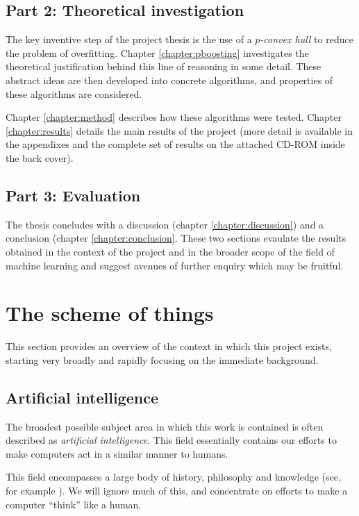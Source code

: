 \subsection*{Part 2: Theoretical investigation}

The key inventive step of the project thesis is the use of a
\emph{$p$-convex hull} to reduce the problem of overfitting.  Chapter 
\ref{chapter:pboosting} investigates the theoretical justification
behind this line of reasoning in some detail.  These abstract ideas
are then developed into concrete algorithms, and properties of these
algorithms are considered.

Chapter \ref{chapter:method} describes how these algorithms were
tested.  Chapter \ref{chapter:results} details the main results of the
project (more detail is available in the appendixes and the complete
set of results on the attached CD-ROM inside the back cover).

\subsection*{Part 3: Evaluation}

The thesis concludes with a discussion (chapter
\ref{chapter:discussion}) and a conclusion (chapter
\ref{chapter:conclusion}.  These two sections evaulate the results
obtained in the context of the project and in the broader scope of the
field of machine learning and suggest avenues of further enquiry which
may be fruitful.

\section{The scheme of things}

This section provides an overview of the context in which this project
exists, starting very broadly and rapidly focusing on the immediate
background.


\subsection{Artificial intelligence}

The broadest possible subject area in which this work is contained is
often described as \emph{artificial intelligence}.  This field
essentially contains our efforts to make computers act in a similar
manner to humans.

This field encompasses a large body of history, philosophy and
knowledge (see, for example \cite{Penrose89}).  We will ignore much
of this, and concentrate on efforts to make a computer ``think'' like
a human.

